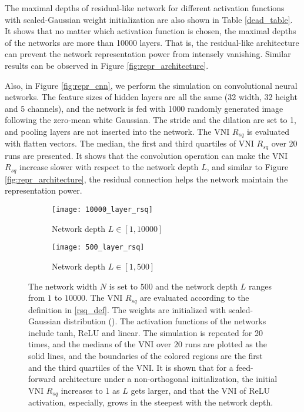 The maximal depths of residual-like network for different activation functions with scaled-Gaussian
weight initialization are also shown in Table \ref{dead_table}.
It shows that no matter which activation function is chosen, the maximal depths of the networks are
more than 10000 layers. That is, the residual-like architecture can prevent the network representation
power from intensely vanishing. Similar results can be observed in Figure \ref{fig:repr_architecture}.

Also, in Figure \ref{fig:repr_cnn}, we perform the simulation on convolutional neural networks.
The feature sizes of hidden layers are all the same (32 width, 32 height and 5 channels), and the
network is fed with 1000 randomly generated image following the zero-mean white Gaussian.
The stride and the dilation are set to 1, and pooling layers are not inserted into the network.
The VNI $R_{sq}$ is evaluated with flatten vectors.
The median, the first and third quartiles of VNI $R_{sq}$ over 20 runs are presented.
It shows that the convolution operation can make the VNI $R_{sq}$ increase slower with respect to
the network depth $L$, and similar to Figure \ref{fig:repr_architecture}, the residual connection
helps the network maintain the representation power.

\begin{figure}[h]
    \centering
    \newcommand{\myWidth}{0.9\textwidth}
    \begin{subfigure}{\myWidth}
      \centering
      \caption{Network depth $L\in[1, 10000]$}
      \texttt{[image: 10000\_layer\_rsq]}
      \label{fig:repr_general_a}
    \end{subfigure}
    
    \begin{subfigure}{\myWidth}
      \centering
      \caption{Network depth $L\in[1, 500]$}
      \texttt{[image: 500\_layer\_rsq]}
      \label{fig:repr_general_b}
    \end{subfigure}%
    \caption[The initial VNI $R_{sq}$ of Gaussian initialized networks.]{
        The network width $N$ is set to $500$ and the network depth $L$ ranges from $1$ to
        $10000$. The VNI $R_{sq}$ are evaluated according to the definition in \eqref{rsq_def}.
        The weights are initialized with scaled-Gaussian distribution (\cite{xavier, he}).
        The activation functions of the networks include tanh, ReLU and linear.
        The simulation is repeated for 20 times, and the medians of the VNI over 20 runs
        are plotted as the solid lines, and the boundaries of the colored regions are the first
        and the third quartiles of the VNI. It is shown that for a feed-forward architecture
        under a non-orthogonal initialization, the initial VNI $R_{sq}$ increases to 1 as $L$
        gets larger, and that the VNI of ReLU activation, especially, grows in the steepest
        with the network depth.
    }
    \label{fig:repr_general}
\end{figure}


